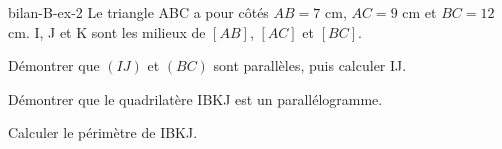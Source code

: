 \begin{blocEdition}{bilan-B-ex-2}
Le triangle ABC a pour côtés $AB=7$ cm, $AC=9$ cm et $BC=12$ cm. I, J et K sont les milieux de $[AB]$, $[AC]$ et $[BC]$.\begin{questions}
\item Démontrer que $(IJ)$ et $(BC)$ sont parallèles, puis calculer IJ.
\item Démontrer que le quadrilatère IBKJ est un parallélogramme.
\item Calculer le périmètre de IBKJ.
\end{questions}\label{fig-bilan-B-ex-2}
\par{}\par\par{}\par{}\par{}\par{}\par{}\par{}
\end{blocEdition}
